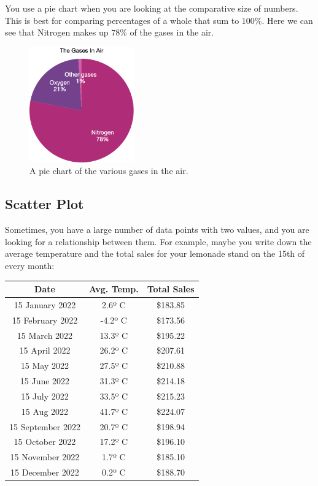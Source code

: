 You use a pie chart when you are looking at the comparative size of numbers.
This is best for comparing percentages of a whole that sum to $100\%$. Here we can see that Nitrogen makes up $78\%$ of the gases in the air.
\begin{figure}[htbp]
    \centering
    \includegraphics[width=0.4\textwidth]{AirPie.png}
    \caption{A pie chart of the various gases in the air.}
    \label{fig:AirPie}
\end{figure}

\subsection{Scatter Plot}

Sometimes, you have a large number of data points with two values, and you are
looking for a relationship between them.  For example, maybe you write
down the average temperature and the total sales for your lemonade
stand on the 15th of every month:

\begin{center}
  \begin{tabular}{c | c | c}
    Date &	Avg. Temp. &	Total Sales \\
    \hline
  15 January 2022 & 2.6º C & \$183.85 \\
  15 February 2022 & -4.2º C & \$173.56\\
  15 March 2022 & 13.3º C & \$195.22\\
  15 April 2022 & 26.2º C & \$207.61\\
  15 May 2022 & 27.5º C & \$210.88\\
  15 June 2022 & 31.3º C & \$214.18\\
  15 July 2022 & 33.5º C & \$215.23\\
  15 Aug 2022 & 41.7º C & \$224.07\\
  15 September 2022 & 20.7º C & \$198.94\\
  15 October 2022 & 17.2º C & \$196.10\\
  15 November 2022 & 1.7º C & \$185.10\\
  15 December 2022 & 0.2º C & \$188.70 \\
  \end{tabular}
\end{center}


